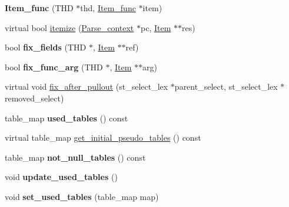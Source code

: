 \begin{DoxyCompactItemize}
\mbox{\label{classItem__func_a79f2bc8e515f254068cd29ef858e3014}} 
{\bfseries Item\+\_\+func} (T\+HD $\ast$thd, \mbox{\hyperlink{classItem__func}{Item\+\_\+func}} $\ast$item)
\item 
virtual bool \mbox{\hyperlink{classItem__func_a6413cdbe7b14be77cc47462c9fc87ddb}{itemize}} (\mbox{\hyperlink{structParse__context}{Parse\+\_\+context}} $\ast$pc, \mbox{\hyperlink{classItem}{Item}} $\ast$$\ast$res)
\item 
\mbox{\label{classItem__func_a7195055b20305dc964ce7f2694b5f386}} 
bool {\bfseries fix\+\_\+fields} (T\+HD $\ast$, \mbox{\hyperlink{classItem}{Item}} $\ast$$\ast$ref)
\item 
\mbox{\label{classItem__func_a2adf50f8553b1fdfdc2b5b0aafd3d2e0}} 
bool {\bfseries fix\+\_\+func\+\_\+arg} (T\+HD $\ast$, \mbox{\hyperlink{classItem}{Item}} $\ast$$\ast$arg)
\item 
virtual void \mbox{\hyperlink{classItem__func_ab2b8cc7a3bf580679718da7e99e3e8d9}{fix\+\_\+after\+\_\+pullout}} (st\+\_\+select\+\_\+lex $\ast$parent\+\_\+select, st\+\_\+select\+\_\+lex $\ast$removed\+\_\+select)
\item 
\mbox{\label{classItem__func_aa66a04f9edc3400082bcf5faba5a005e}} 
table\+\_\+map {\bfseries used\+\_\+tables} () const
\item 
virtual table\+\_\+map \mbox{\hyperlink{classItem__func_a379f54a79ca65beebc1e2571f3bf0d35}{get\+\_\+initial\+\_\+pseudo\+\_\+tables}} () const
\item 
\mbox{\label{classItem__func_a27351ef153841a1fe5dd29a03f68e2e6}} 
table\+\_\+map {\bfseries not\+\_\+null\+\_\+tables} () const
\item 
\mbox{\label{classItem__func_a007f1d1512e84dee584837a6bc3a98cc}} 
void {\bfseries update\+\_\+used\+\_\+tables} ()
\item 
\mbox{\label{classItem__func_a6947f67cf1d8a5bed95260a024f7d44f}} 
void {\bfseries set\+\_\+used\+\_\+tables} (table\+\_\+map map)
\item 
\mbox{\label{classItem__func_a97ed3323a2aba55fbbd3a6f882d755b7}} 
$$
\end{DoxyCompactItemize}

